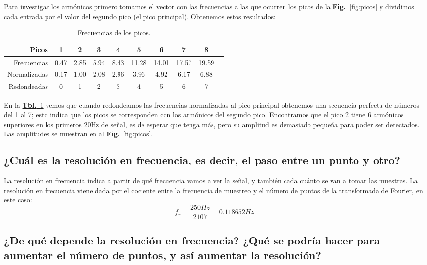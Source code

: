 \documentclass{article}
\begin{document}
Para investigar los armónicos primero tomamos el vector con las
frecuencias a las que ocurren los picos de la
\hyperref[fig:picos]{\textbf{Fig.}~\ref*{fig:picos}} y dividimos cada
entrada por el valor del segundo pico (el pico principal). Obtenemos
estos resultados:

\begin{table}[h!]
\centering
\begin{tabular}{|r|c|c|c|c|c|c|c|c|c|}
\hline
\textbf{Picos} & \textbf{1} & \textbf{2} & \textbf{3} & \textbf{4} &
	\textbf{5} & \textbf{6} & \textbf{7} & \textbf{8}\\\hline
Frecuencias & 0.47 & 2.85 & 5.94 & 8.43 & 11.28 & 14.01 & 17.57 & 19.59\\\hline
Normalizadas & 0.17 & 1.00 & 2.08 & 2.96 & 3.96 & 4.92 & 6.17 & 6.88\\\hline
Redondeadas  & 0 & 1 & 2 & 3 & 4 & 5 & 6 & 7\\\hline
\end{tabular}
\caption{Frecuencias de los picos.}
\label{table:fcs}
\end{table}
\newpage
En la \hyperref[table:fcs]{\textbf{Tbl.}~\ref*{table:fcs}} vemos que
cuando redondeamos las frecuencias normalizadas al pico principal
obtenemos una secuencia perfecta de números del 1 al 7; esto indica
que los picos se corresponden con los armónicos del segundo pico.
Encontramos que el pico 2 tiene 6 armónicos superiores en los primeros
20Hz de señal, es de esperar que tenga más, pero su amplitud es
demasiado pequeña para poder ser detectados. Las amplitudes se
muestran en al \hyperref[fig:picos]{\textbf{Fig.}~\ref*{fig:picos}}.

\subsection{¿Cuál es la resolución en frecuencia, es decir, el paso entre un punto y otro?}

La resolución en frecuencia indica a partir de qué frecuencia vamos a
ver la señal, y también cada cuánto se van a tomar las muestras.  La
resolución en frecuencia viene dada por el cociente entre la
frecuencia de muestreo y el número de puntos de la transformada de
Fourier, en este caso:
\begin{equation}
f_{r} = \dfrac{250 Hz}{2107} = 0.118652 Hz
\end{equation}

\subsection{¿De  qué  depende  la  resolución  en  frecuencia? ¿Qué  se  podría  hacer  para aumentar el número de puntos, y así aumentar la resolución?}
\end{document}
